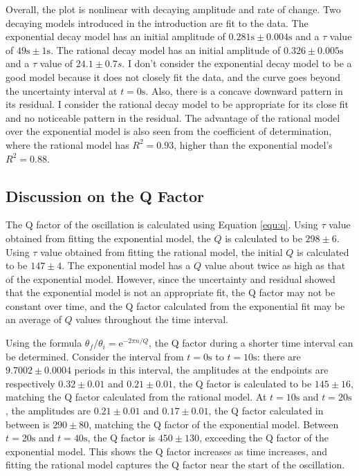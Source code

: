 \documentclass[12pt]{article}
\newcommand{\e}{\mathrm{e}}
\begin{document}
Overall, the plot is nonlinear with decaying amplitude and rate of change. Two decaying models introduced in the introduction are fit to the data. The exponential decay model has an initial amplitude of $0.281\mathrm{s}\pm0.004\mathrm{s}$ and a $\tau$ value of $49\mathrm{s}\pm1\mathrm{s}$. The rational decay model has an initial amplitude of $0.326\pm0.005\mathrm{s}$ and a $\tau$ value of $24.1\pm0.7s$. I don't consider the exponential decay model to be a good model because it does not closely fit the data, and the curve goes beyond the uncertainty interval at $t=0\mathrm{s}$. Also, there is a concave downward pattern in its residual. I consider the rational decay model to be appropriate for its close fit and no noticeable pattern in the residual. The advantage of the rational model over the exponential model is also seen from the coefficient of determination, where the rational model has $R^2=0.93$, higher than the exponential model's $R^2=0.88$.

\subsection{Discussion on the Q Factor} \label{section:q}

The Q factor of the oscillation is calculated using Equation \ref{equ:q}. Using $\tau$ value obtained from fitting the exponential model, the $Q$ is calculated to be $298\pm6$. Using $\tau$ value obtained from fitting the rational model, the initial $Q$ is calculated to be $147\pm4$. The exponential model has a $Q$ value about twice as high as that of the exponential model. However, since the uncertainty and residual showed that the exponential model is not an appropriate fit, the Q factor may not be constant over time, and the Q factor calculated from the exponential fit may be an average of $Q$ values throughout the time interval.

Using the formula $\theta_f/\theta_i=\e^{-2\pi n/Q}$, the Q factor during a shorter time interval can be determined. Consider the interval from $t=0\mathrm{s}$ to $t=10\mathrm{s}$: there are $9.7002\pm0.0004$ periods in this interval, the amplitudes at the endpoints are respectively $0.32\pm0.01$ and $0.21\pm0.01$, the Q factor is calculated to be $145\pm16$, matching the Q factor calculated from the rational model. At $t=10\mathrm{s}$ and $t=20\mathrm{s}$, the amplitudes are $0.21\pm0.01$ and $0.17\pm0.01$, the Q factor calculated in between is $290\pm80$, matching the Q factor of the exponential model. Between $t=20\mathrm{s}$ and $t=40\mathrm{s}$, the Q factor is $450\pm130$, exceeding the Q factor of the exponential model. This shows the Q factor increases as time increases, and fitting the rational model captures the Q factor near the start of the oscillation.
\end{document}
